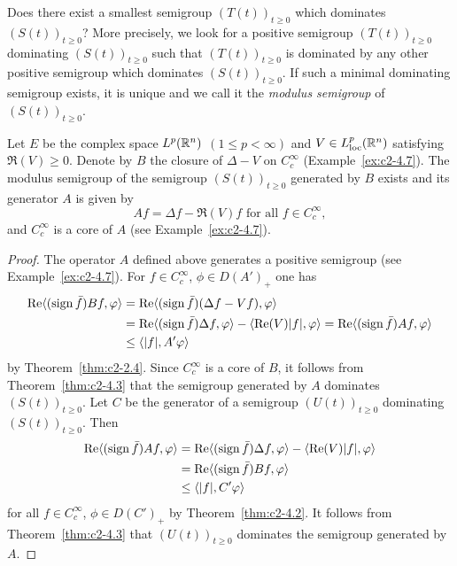 Does there exist a smallest semigroup $(T(t))_{t \geq 0}$ which dominates $(S(t))_{t \geq 0}$?
More precisely, we look for a positive semigroup $(T(t))_{t \geq 0}$ dominating $(S(t))_{t \geq 0}$ such that $(T(t))_{t \geq 0}$ is dominated
by any other positive semigroup which dominates $(S(t))_{t \geq 0}$.
If such a minimal dominating semigroup exists, it is unique and we call it the
\emph{modulus semigroup} of\/ $(S(t))_{t \geq 0}$.
\begin{example}
\label{ex:c2-4.15}
\quad Let $E$ be the complex space $L^{p}(\mathbb{R}^{n})$ $(1 \leq p < \infty)$ and $V \in L^{p}_{\text{loc}}(\mathbb{R}^{n})$ satisfying $\Re(V) \geq 0$.
Denote by $B$ the closure of\/ $\Delta - V$ on $C^{\infty}_{c}$
(\cf Example~\ref{ex:c2-4.7}).
The modulus semigroup of the semigroup $(S(t))_{t \geq 0}$ generated by $B$ exists and its generator $A$ is given by 
\[
Af = \Delta f - \Re(V)f \text{ for all } f \in C^{\infty}_{c} ,
\]
and $C^{\infty}_{c}$ is a core of\/ $A$ (see Example~\ref{ex:c2-4.7}).
\end{example}
\begin{proof}
The operator $A$ defined above generates a positive semigroup (see Example~\ref{ex:c2-4.7}).
For $f \in C^{\infty}_{c}$, $\phi \in D(A')_{+}$ one has
\begin{align*}
\Re\langle(\sign  \bar{f})Bf,\phi\rangle &= \Re\langle(\sign  \bar{f})(\Delta f - Vf),\phi\rangle \\
&=\Re\langle(\sign  \bar{f})\Delta f,\phi\rangle - \langle\Re(V)|f|,\phi\rangle = \Re\langle(\sign  \bar{f})Af,\phi\rangle \\
&\leq \langle|f|,A'\phi\rangle 
\end{align*}
by Theorem~\ref{thm:c2-2.4}.
Since $C^{\infty}_{c}$ is a core of\/ $B$, it follows from Theorem~\ref{thm:c2-4.3}   that the semigroup generated by $A$ dominates $(S(t))_{t \geq 0}$.
Let $C$ be the generator of a semigroup $(U(t))_{t \geq 0}$ dominating $(S(t))_{t \geq 0}$.
Then
\begin{align*}
\Re\langle(\sign  \bar{f})Af,\phi\rangle &= \Re\langle(\sign  \bar{f})\Delta f,\phi\rangle - \langle\Re(V)|f|,\phi\rangle \\
&= \Re\langle(\sign  \bar{f})Bf,\phi\rangle\\
&\leq \langle|f|,C'\phi\rangle 
\end{align*}
for all  $f \in C^{\infty}_{c}$, $\phi \in D(C')_{+}$  by Theorem~\ref{thm:c2-4.2}. 
It follows from Theorem~\ref{thm:c2-4.3}   that $(U(t))_{t \geq 0}$ dominates the semigroup generated by $A$.
\end{proof}
